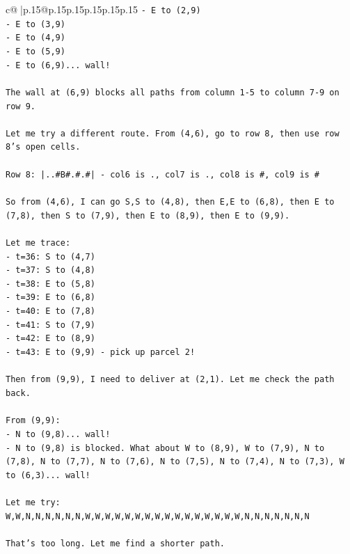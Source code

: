 \documentclass{article}
\begin{document}
{\begin{supertabular}{c@{$\;$}|p{.15\linewidth}@{}p{.15\linewidth}p{.15\linewidth}p{.15\linewidth}p{.15\linewidth}p{.15\linewidth}}
{{{\texttt{{-} E to (2,9)} \\
\texttt{{-} E to (3,9)} \\
\texttt{{-} E to (4,9)} \\
\texttt{{-} E to (5,9)} \\
\texttt{{-} E to (6,9)... wall!} \\
\\ 
\texttt{The wall at (6,9) blocks all paths from column 1{-}5 to column 7{-}9 on row 9.} \\
\\ 
\texttt{Let me try a different route. From (4,6), go to row 8, then use row 8's open cells.} \\
\\ 
\texttt{Row 8: |..\#B\#.\#.\#| {-} col6 is ., col7 is ., col8 is \#, col9 is \#} \\
\\ 
\texttt{So from (4,6), I can go S,S to (4,8), then E,E to (6,8), then E to (7,8), then S to (7,9), then E to (8,9), then E to (9,9).} \\
\\ 
\texttt{Let me trace:} \\
\texttt{{-} t=36: S to (4,7)} \\
\texttt{{-} t=37: S to (4,8)} \\
\texttt{{-} t=38: E to (5,8)} \\
\texttt{{-} t=39: E to (6,8)} \\
\texttt{{-} t=40: E to (7,8)} \\
\texttt{{-} t=41: S to (7,9)} \\
\texttt{{-} t=42: E to (8,9)} \\
\texttt{{-} t=43: E to (9,9) {-} pick up parcel 2!} \\
\\ 
\texttt{Then from (9,9), I need to deliver at (2,1). Let me check the path back.} \\
\\ 
\texttt{From (9,9):} \\
\texttt{{-} N to (9,8)... wall!} \\
\texttt{{-} N to (9,8) is blocked. What about W to (8,9), W to (7,9), N to (7,8), N to (7,7), N to (7,6), N to (7,5), N to (7,4), N to (7,3), W to (6,3)... wall!} \\
\\ 
\texttt{Let me try: W,W,N,N,N,N,N,N,W,W,W,W,W,W,W,W,W,W,W,W,W,W,W,W,N,N,N,N,N,N,N} \\
\\ 
\texttt{That's too long. Let me find a shorter path.} \\
}}}
\end{supertabular}}
\end{document}
